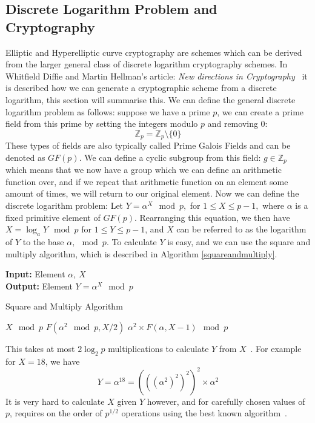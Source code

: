 \subsection{Discrete Logarithm Problem and Cryptography}
Elliptic and Hyperelliptic curve cryptography are schemes which can be derived from the larger general class of discrete logarithm cryptography schemes. In Whitfield Diffie and Martin Hellman's article: \emph{New directions in Cryptography}~\cite{Diffie:2006:NDC:2263321.2269104} it is described how we can generate a cryptographic scheme from a discrete logarithm, this section will summarise this. We can define the general discrete logarithm problem as follows: suppose we have a prime $p$, we can create a prime field from this prime by setting the integers modulo $p$ and removing 0: $$\mathbb{Z}_p = \mathbb{Z}_p \setminus \{0\}$$ These types of fields are also typically called Prime Galois Fields and can be denoted as $GF(p)$. We can define a cyclic subgroup from this field: $g \in \mathbb{Z}_p$ which means that we now have a group which we can define an arithmetic function over, and if we repeat that arithmetic function on an element some amount of times, we will return to our original element. Now we can define the discrete logarithm problem: Let $Y = \alpha^X\mod{p},$ for $1 \leq X \leq p-1,$ where $\alpha$ is a fixed primitive element of $GF(p)$. Rearranging this equation, we then have $X = \log_aY\mod{p}$ for $1 \leq Y \leq p-1$, and $X$ can be referred to as the logarithm of $Y$ to the base $\alpha,\mod{p}.$ To calculate $Y$ is easy, and we can use the square and multiply algorithm, which is described in Algorithm \ref{squareandmultiply}.
\begin{algorithm}[!htb]
\textbf{Input:} Element $\alpha$, $X$ \\
\textbf{Output:} Element $Y = \alpha^X\mod p$ 
\caption{Square and Multiply Algorithm}\label{squareandmultiply}
\algrule
\begin{algorithmic}[1]
\Return $X \mod{p}$
\Return $F(\alpha^2\mod{p}, X/2)$ 
\Return $\alpha^2 \times F(\alpha, X-1) \mod{p}$
\EndIf
\EndFunction
\end{algorithmic}
\end{algorithm}
This takes at most $2\log_2p$ multiplications to calculate $Y$ from $X$~\cite{10007220734}. For example for $X = 18$, we have $$Y = \alpha^{18} = (((\alpha^2)^2)^2)^2 \times \alpha^2$$ It is very hard to calculate $X$ given $Y$ however, and for carefully chosen values of $p$, requires on the order of $p^{1/2}$ operations using the best known algorithm~\cite{mcclellan1974art}. 
